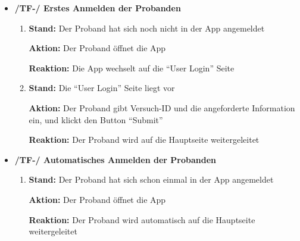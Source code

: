 \documentclass[a4paper]{scrreprt}
\begin{document}
            \begin{itemize}

            \item \textbf{/TF-/ Erstes Anmelden der Probanden}
            \begin{enumerate}
                \item \par \textbf{Stand: }Der Proband hat sich noch nicht in der App angemeldet
                \par \textbf{Aktion: }Der Proband öffnet die App
                \par \textbf{Reaktion: }Die App wechselt auf die ``User Login'' Seite
                \item \par \textbf{Stand: }Die ``User Login'' Seite liegt vor
                \par \textbf{Aktion: }Der Proband gibt Versuch-ID und die angeforderte Information ein, und klickt den Button ``Submit''
                \par \textbf{Reaktion: }Der Proband wird auf die Hauptseite weitergeleitet
            \end{enumerate}

	        \item \textbf{/TF-/ Automatisches Anmelden der Probanden}
	        \begin{enumerate}
	        	\item \par \textbf{Stand: }Der Proband hat sich schon einmal in der App angemeldet
	        	\par \textbf{Aktion: }Der Proband öffnet die App
	        	\par \textbf{Reaktion: }Der Proband wird automatisch auf die Hauptseite weitergeleitet
	        \end{enumerate}


\end{itemize}
\end{document}
